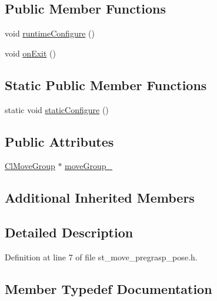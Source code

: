 \subsection*{Public Member Functions}
\begin{DoxyCompactItemize}
\item 
void \hyperlink{structsm__moveit__4_1_1pick__states_1_1StMovePregraspPose_ae9ffdf77d89169b5f4fb2cb2fadd56fc}{runtime\+Configure} ()
\item 
void \hyperlink{structsm__moveit__4_1_1pick__states_1_1StMovePregraspPose_ae2f50199e1766c1bcdb8fcd25e9a0e16}{on\+Exit} ()
\end{DoxyCompactItemize}
\subsection*{Static Public Member Functions}
\begin{DoxyCompactItemize}
\item 
static void \hyperlink{structsm__moveit__4_1_1pick__states_1_1StMovePregraspPose_afb6abd382c1c9f35dd5f74967301cc48}{static\+Configure} ()
\end{DoxyCompactItemize}
\subsection*{Public Attributes}
\begin{DoxyCompactItemize}
\item 
\hyperlink{classmoveit__z__client_1_1ClMoveGroup}{Cl\+Move\+Group} $\ast$ \hyperlink{structsm__moveit__4_1_1pick__states_1_1StMovePregraspPose_a7ac8229ab37dba1b2eb43668e4adceea}{move\+Group\+\_\+}
\end{DoxyCompactItemize}
\subsection*{Additional Inherited Members}


\subsection{Detailed Description}


Definition at line 7 of file st\+\_\+move\+\_\+pregrasp\+\_\+pose.\+h.



\subsection{Member Typedef Documentation}
\mbox{\label{structsm__moveit__4_1_1pick__states_1_1StMovePregraspPose_a4329bf7123b5978a7418bda57b17541d}} 
